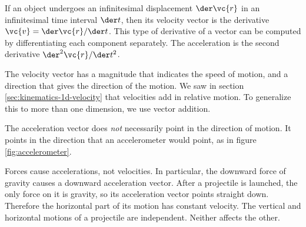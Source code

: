 If an object undergoes an infinitesimal displacement $\der\vc{r}$ in an
infinitesimal time interval $\der t$, then its velocity vector is the derivative
$\vc{v}=\der\vc{r}/\der t$. This type of derivative of a vector can be computed
by differentiating each component separately. The acceleration is the
second derivative $\der^2\vc{r}/\der t^2$.



The velocity vector has a magnitude that indicates the speed of motion, and
a direction that gives the direction of the motion. We saw in section
\ref{sec:kinematics-1d-velocity} that velocities add in relative motion.
To generalize this to more than one dimension, we use vector addition.

The acceleration vector does \emph{not} necessarily point in the direction
of motion. It points in the direction that an accelerometer would point,
as in figure \ref{fig:accelerometer}.


Forces cause accelerations, not velocities. In particular, the downward force of gravity
causes a downward acceleration vector. After a projectile is launched, the only force
on it is gravity, so its acceleration vector points straight down. Therefore the horizontal
part of its motion has constant velocity. The vertical and horizontal motions of a projectile
are independent. Neither affects the other.
